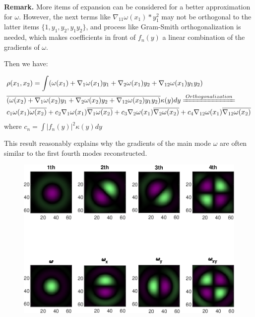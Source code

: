\documentclass{article}
\numberwithin{equation}{section}
\begin{document}
\textbf{Remark.} More items of expansion can be considered for a better approximation for $\omega$. However, the next terms like $\nabla_{11} \omega(x_1) * y_1^2 $ may not be orthogonal to the latter items $\{1,y_1,y_2,y_1y_2\}$, and process like Gram-Smith orthogonalization is needed, which makes  coefficients in front of $f_n(y)$ a linear combination of the gradients of $\omega$.

Then we have:
 
 
  
 $$
 \begin{aligned}
 &\rho(x_1,x_2) = 
 \int (\omega(x_1) + \nabla_1 \omega(x_1)y_1 + \nabla_2 \omega(x_1)y_2 + \nabla_{12}\omega(x_1) y_1 y_2)\\ &\overline{(\omega(x_2) + \nabla_1 \omega(x_2)y_1 + \nabla_2 \omega(x_2)y_2 + \nabla_{12}\omega(x_2) y_1 y_2)}
 \kappa(y)dy \xlongequal{Orthogonalization}\\
 &
 c_1 \omega(x_1)\overline{\omega(x_2)} +
 c_2 \nabla_{1}\omega(x_1)\overline{\nabla_{1}\omega(x_2)} +
 c_3 \nabla_{2}\omega(x_1)\overline{\nabla_{2}\omega(x_2)}+ 
 c_4 \nabla_{12}\omega(x_1)\overline{\nabla_{12}\omega(x_2)} 
  \end{aligned}
 $$
where $c_n = \int |f_n(y)|^2 \kappa(y) dy$

This result reasonably explains why the gradients of the main mode $\omega$ are often similar to the first fourth modes reconstructed. 

\begin{figure}[H]
\centering

\includegraphics[width=0.9\linewidth]{../figures/gradients.eps}  
 \end{figure}
\end{document}

